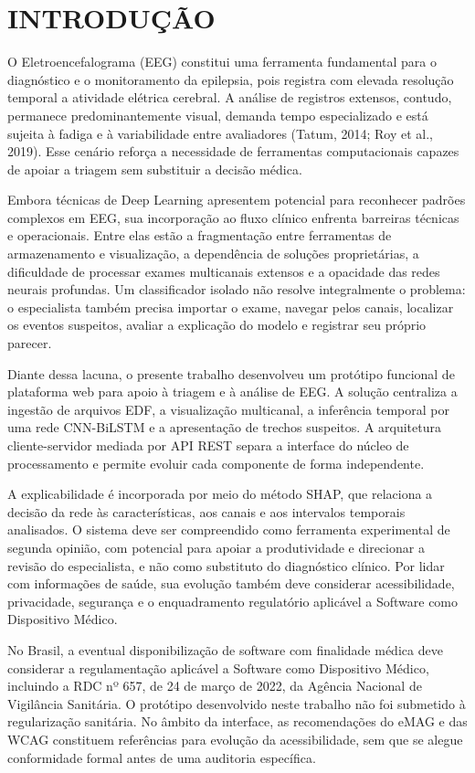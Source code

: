 \cleardoublepage
\textual
\pagestyle{tcc}
\chapter{INTRODUÇÃO}
O Eletroencefalograma (EEG) constitui uma ferramenta fundamental para o diagnóstico e o monitoramento da epilepsia, pois registra com elevada resolução temporal a atividade elétrica cerebral. A análise de registros extensos, contudo, permanece predominantemente visual, demanda tempo especializado e está sujeita à fadiga e à variabilidade entre avaliadores (Tatum, 2014; Roy et al., 2019). Esse cenário reforça a necessidade de ferramentas computacionais capazes de apoiar a triagem sem substituir a decisão médica.

Embora técnicas de Deep Learning apresentem potencial para reconhecer padrões complexos em EEG, sua incorporação ao fluxo clínico enfrenta barreiras técnicas e operacionais. Entre elas estão a fragmentação entre ferramentas de armazenamento e visualização, a dependência de soluções proprietárias, a dificuldade de processar exames multicanais extensos e a opacidade das redes neurais profundas. Um classificador isolado não resolve integralmente o problema: o especialista também precisa importar o exame, navegar pelos canais, localizar os eventos suspeitos, avaliar a explicação do modelo e registrar seu próprio parecer.

Diante dessa lacuna, o presente trabalho desenvolveu um protótipo funcional de plataforma web para apoio à triagem e à análise de EEG. A solução centraliza a ingestão de arquivos EDF, a visualização multicanal, a inferência temporal por uma rede CNN-BiLSTM e a apresentação de trechos suspeitos. A arquitetura cliente-servidor mediada por API REST separa a interface do núcleo de processamento e permite evoluir cada componente de forma independente.

A explicabilidade é incorporada por meio do método SHAP, que relaciona a decisão da rede às características, aos canais e aos intervalos temporais analisados. O sistema deve ser compreendido como ferramenta experimental de segunda opinião, com potencial para apoiar a produtividade e direcionar a revisão do especialista, e não como substituto do diagnóstico clínico. Por lidar com informações de saúde, sua evolução também deve considerar acessibilidade, privacidade, segurança e o enquadramento regulatório aplicável a Software como Dispositivo Médico.

No Brasil, a eventual disponibilização de software com finalidade médica deve considerar a regulamentação aplicável a Software como Dispositivo Médico, incluindo a RDC nº 657, de 24 de março de 2022, da Agência Nacional de Vigilância Sanitária. O protótipo desenvolvido neste trabalho não foi submetido à regularização sanitária. No âmbito da interface, as recomendações do eMAG e das WCAG constituem referências para evolução da acessibilidade, sem que se alegue conformidade formal antes de uma auditoria específica.

